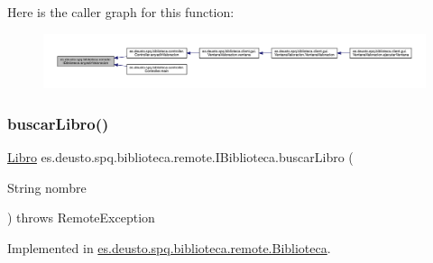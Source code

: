 Here is the caller graph for this function\+:
\nopagebreak
\begin{figure}[H]
\begin{center}
\leavevmode
\includegraphics[width=350pt]{interfacees_1_1deusto_1_1spq_1_1biblioteca_1_1remote_1_1_i_biblioteca_a72b9d5541556bacfdfb37f47753972c1_icgraph}
\end{center}
\end{figure}
\mbox{\label{interfacees_1_1deusto_1_1spq_1_1biblioteca_1_1remote_1_1_i_biblioteca_a29a3d22f9c3f8b84604eec2ab9955dfe}} 
\subsubsection{\texorpdfstring{buscar\+Libro()}{buscarLibro()}}
{\footnotesize\ttfamily \mbox{\hyperlink{classes_1_1deusto_1_1spq_1_1biblioteca_1_1data_1_1_libro}{Libro}} es.\+deusto.\+spq.\+biblioteca.\+remote.\+I\+Biblioteca.\+buscar\+Libro (\begin{DoxyParamCaption}\item[{String}]{nombre }\end{DoxyParamCaption}) throws Remote\+Exception}



Implemented in \mbox{\hyperlink{classes_1_1deusto_1_1spq_1_1biblioteca_1_1remote_1_1_biblioteca_a5d8bbdd7819a301e1a7bfee2795b9040}{es.\+deusto.\+spq.\+biblioteca.\+remote.\+Biblioteca}}.

